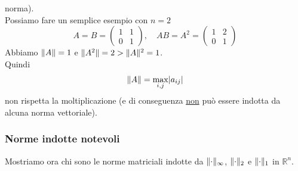 \documentclass[12pt,a4paper]{article}
\DeclarePairedDelimiter{\abs}{\lvert}{\rvert}
\DeclarePairedDelimiter{\norma}{\lVert}{\rVert}
\begin{document}
norma). \\
Possiamo fare un semplice esempio con $n = 2$
\[A = B = \begin{pmatrix}
    1 & 1 \\
    0 & 1
\end{pmatrix}, \quad AB = A^2 =
\begin{pmatrix}
    1 & 2 \\
    0 & 1
\end{pmatrix}\]
Abbiamo $\norma{A} = 1$ e $\norma{A^2} = 2 > \norma{A}^2 = 1$.\\
Quindi 
\[\norma{A} = \max_{i,j} \abs{a_{ij}}\]
non rispetta la moltiplicazione (e di conseguenza \uline{non} può essere indotta da alcuna norma vettoriale).

\subsubsection{Norme indotte notevoli}
Mostriamo ora chi sono le norme matriciali indotte da
$\norma{\cdot}_{\infty}$, $\norma{\cdot}_2$ e $\norma{\cdot}_1$ in $\mathbb{R}^n$.\\
\end{document}
